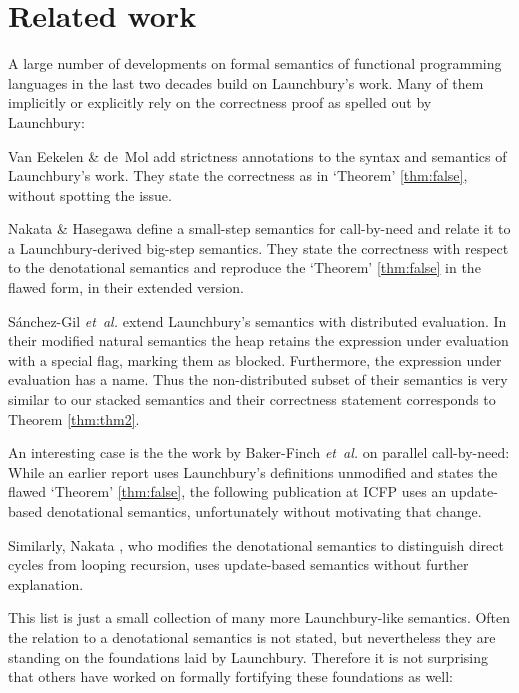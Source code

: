 \documentclass{jfp1}
\theoremstyle{nonumberbreak}
\begin{document}
\section{Related work}

A large number of developments on formal semantics of functional programming languages in the last two decades build on Launchbury’s work. Many of them implicitly or explicitly rely on the correctness proof as spelled out by Launchbury:

Van Eekelen \& de~Mol  add strictness annotations to the syntax and semantics of Launchbury’s work. They state the correctness as in `Theorem' \ref{thm:false}, without spotting the issue.


Nakata \& Hasegawa  define a small-step semantics for call-by-need and relate it to a Launchbury-derived big-step semantics. They state the correctness with respect to the denotational semantics and reproduce the `Theorem' \ref{thm:false} in the flawed form, in their extended version.

S{\'a}nchez-Gil {\em et~al.}  extend Launchbury's semantics with distributed evaluation.  In their modified natural semantics the heap retains the expression under evaluation with a special flag, marking them as blocked. Furthermore, the expression under evaluation has a name. Thus the non-distributed subset of their semantics is very similar to our stacked semantics and their correctness statement corresponds to Theorem \ref{thm:thm2}.

An interesting case is the the work by Baker-Finch {\em et~al.} on parallel call-by-need: While an earlier report  uses Launchbury’s definitions unmodified and states the flawed `Theorem' \ref{thm:false}, the following publication at ICFP  uses an update-based denotational semantics, unfortunately without motivating that change.

Similarly, Nakata  , who modifies the denotational semantics to distinguish direct cycles from looping recursion, uses update-based semantics without further explanation. 

This list is just a small collection of many more Launchbury-like semantics. Often the relation to a denotational semantics is not stated, but nevertheless they are standing on the foundations laid by Launchbury. Therefore it is not surprising that others have worked on formally fortifying these foundations as well:
\end{document}
